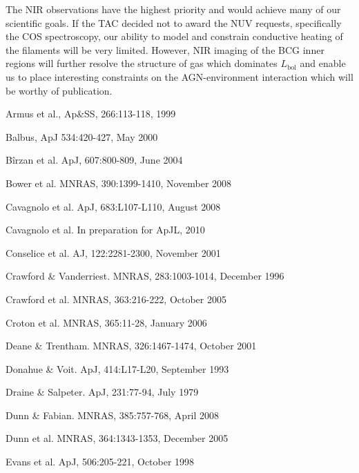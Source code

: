 \documentclass[12pt]{article}
\begin{document}
The NIR observations have the highest priority and would achieve many
of our scientific goals. If the TAC decided not to award the NUV
requests, specifically the COS spectroscopy, our ability to model and
constrain conductive heating of the filaments will be very
limited. However, NIR imaging of the BCG inner regions will further
resolve the structure of gas which dominates $L_{\mathrm{bol}}$ and
enable us to place interesting constraints on the AGN-environment
interaction which will be worthy of publication.

\specialreq

\coordinatedobs

\duplications

\pasthstusage



\noindent [1] Armus et al., Ap\&SS, 266:113-118, 1999

\noindent [2] Balbus, ApJ 534:420-427, May 2000

\noindent [3] B\^irzan et al. ApJ, 607:800-809, June 2004

\noindent [4] Bower et al. MNRAS, 390:1399-1410, November 2008

\noindent [5] Cavagnolo et al. ApJ, 683:L107-L110, August 2008

\noindent [6] Cavagnolo et al. In preparation for ApJL, 2010

\noindent [7] Conselice et al. AJ, 122:2281-2300, November 2001

\noindent [8] Crawford \& Vanderriest. MNRAS, 283:1003-1014, December 1996

\noindent [9] Crawford et al. MNRAS, 363:216-222, October 2005

\noindent [10] Croton et al. MNRAS, 365:11-28, January 2006

\noindent [11] Deane \& Trentham. MNRAS, 326:1467-1474, October 2001

\noindent [12] Donahue \& Voit. ApJ, 414:L17-L20, September 1993

\noindent [13] Draine \& Salpeter. ApJ, 231:77-94, July 1979

\noindent [14] Dunn \& Fabian. MNRAS, 385:757-768, April 2008

\noindent [15] Dunn et al. MNRAS, 364:1343-1353, December 2005

\noindent [16] Evans et al. ApJ, 506:205-221, October 1998
\end{document}
